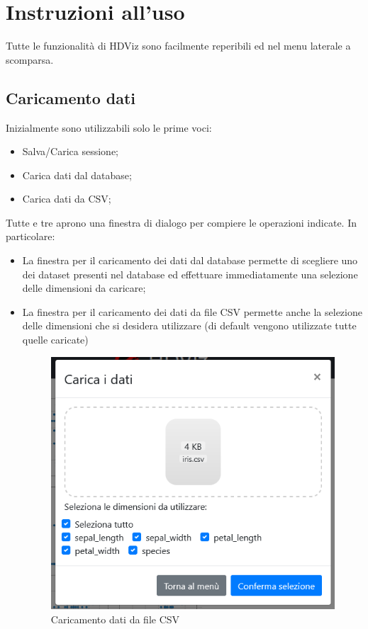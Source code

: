 \section{Instruzioni all'uso}
Tutte le funzionalità di HDViz sono facilmente reperibili ed nel menu laterale a scomparsa.

\subsection{Caricamento dati}
Inizialmente sono utilizzabili solo le prime voci:
\begin{itemize}
	\item Salva/Carica sessione;
	\item Carica dati dal database;
	\item Carica dati da CSV;
\end{itemize}
Tutte e tre aprono una finestra di dialogo per compiere le operazioni indicate. In particolare:
\begin{itemize}
	\item La finestra per il caricamento dei dati dal database permette di scegliere uno dei dataset presenti nel database ed effettuare immediatamente una selezione delle dimensioni da caricare;
	\item  La finestra per il caricamento dei dati da file CSV permette anche la selezione delle dimensioni che si desidera utilizzare (di default vengono utilizzate tutte quelle caricate)
	\begin{figure}[h]
		\includegraphics[scale=0.5]{Images/CaricamentoCSV.png}
		\centering
		\caption{Caricamento dati da file CSV}
	\end{figure}
\end{itemize}
   
